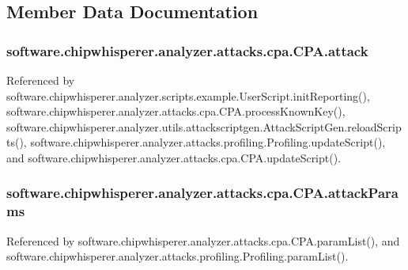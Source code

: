\subsection{Member Data Documentation}
\hypertarget{classsoftware_1_1chipwhisperer_1_1analyzer_1_1attacks_1_1cpa_1_1CPA_a587c513e5f4f4eab10995d628c2db277}{}
\subsubsection[{attack}]{\setlength{\rightskip}{0pt plus 5cm}software.\+chipwhisperer.\+analyzer.\+attacks.\+cpa.\+C\+P\+A.\+attack}\label{classsoftware_1_1chipwhisperer_1_1analyzer_1_1attacks_1_1cpa_1_1CPA_a587c513e5f4f4eab10995d628c2db277}


Referenced by software.\+chipwhisperer.\+analyzer.\+scripts.\+example.\+User\+Script.\+init\+Reporting(), software.\+chipwhisperer.\+analyzer.\+attacks.\+cpa.\+C\+P\+A.\+process\+Known\+Key(), software.\+chipwhisperer.\+analyzer.\+utils.\+attackscriptgen.\+Attack\+Script\+Gen.\+reload\+Scripts(), software.\+chipwhisperer.\+analyzer.\+attacks.\+profiling.\+Profiling.\+update\+Script(), and software.\+chipwhisperer.\+analyzer.\+attacks.\+cpa.\+C\+P\+A.\+update\+Script().

\hypertarget{classsoftware_1_1chipwhisperer_1_1analyzer_1_1attacks_1_1cpa_1_1CPA_a60f3ed82aa38f86c5ea30733bb3316a7}{}
\subsubsection[{attack\+Params}]{\setlength{\rightskip}{0pt plus 5cm}software.\+chipwhisperer.\+analyzer.\+attacks.\+cpa.\+C\+P\+A.\+attack\+Params}\label{classsoftware_1_1chipwhisperer_1_1analyzer_1_1attacks_1_1cpa_1_1CPA_a60f3ed82aa38f86c5ea30733bb3316a7}


Referenced by software.\+chipwhisperer.\+analyzer.\+attacks.\+cpa.\+C\+P\+A.\+param\+List(), and software.\+chipwhisperer.\+analyzer.\+attacks.\+profiling.\+Profiling.\+param\+List().

